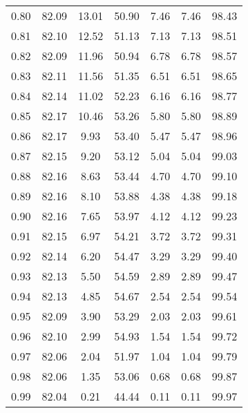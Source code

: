 \begin{tabular}{|c|c|c|c|c|c|c|}
      0.80 &     82.09 &     13.01 &      50.90 &    7.46 &       7.46 &         98.43 \\
      0.81 &     82.10 &     12.52 &      51.13 &    7.13 &       7.13 &         98.51 \\
      0.82 &     82.09 &     11.96 &      50.94 &    6.78 &       6.78 &         98.57 \\
      0.83 &     82.11 &     11.56 &      51.35 &    6.51 &       6.51 &         98.65 \\
      0.84 &     82.14 &     11.02 &      52.23 &    6.16 &       6.16 &         98.77 \\
      0.85 &     82.17 &     10.46 &      53.26 &    5.80 &       5.80 &         98.89 \\
      0.86 &     82.17 &      9.93 &      53.40 &    5.47 &       5.47 &         98.96 \\
      0.87 &     82.15 &      9.20 &      53.12 &    5.04 &       5.04 &         99.03 \\
      0.88 &     82.16 &      8.63 &      53.44 &    4.70 &       4.70 &         99.10 \\
      0.89 &     82.16 &      8.10 &      53.88 &    4.38 &       4.38 &         99.18 \\
      0.90 &     82.16 &      7.65 &      53.97 &    4.12 &       4.12 &         99.23 \\
      0.91 &     82.15 &      6.97 &      54.21 &    3.72 &       3.72 &         99.31 \\
      0.92 &     82.14 &      6.20 &      54.47 &    3.29 &       3.29 &         99.40 \\
      0.93 &     82.13 &      5.50 &      54.59 &    2.89 &       2.89 &         99.47 \\
      0.94 &     82.13 &      4.85 &      54.67 &    2.54 &       2.54 &         99.54 \\
      0.95 &     82.09 &      3.90 &      53.29 &    2.03 &       2.03 &         99.61 \\
      0.96 &     82.10 &      2.99 &      54.93 &    1.54 &       1.54 &         99.72 \\
      0.97 &     82.06 &      2.04 &      51.97 &    1.04 &       1.04 &         99.79 \\
      0.98 &     82.06 &      1.35 &      53.06 &    0.68 &       0.68 &         99.87 \\
      0.99 &     82.04 &      0.21 &      44.44 &    0.11 &       0.11 &         99.97 \\
\bottomrule
\end{tabular}
